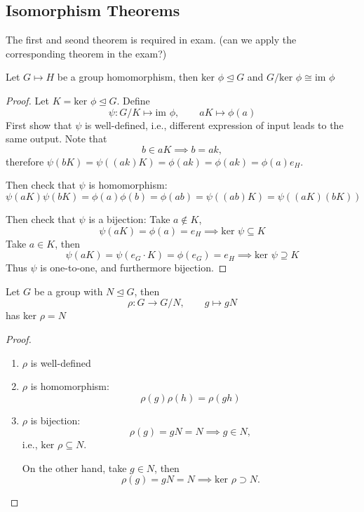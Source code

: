 \subsection{Isomorphism Theorems}
The first and seond theorem is required in exam. (can we apply the corresponding theorem in the exam?)

\begin{theorem}
Let $G\mapsto H$ be a group homomorphism, then $\mbox{ker }\phi\trianglelefteq G$ and $G/\mbox{ker }\phi\cong\mbox{im }\phi$
\end{theorem}
\begin{proof}
Let $K=\mbox{ker }\phi\trianglelefteq G$. Define 
\[
\psi:G/K\mapsto\mbox{im }\phi,\qquad
aK\mapsto\phi(a)
\]
First show that $\psi$ is well-defined, i.e., different expression of input leads to the same output. Note that
\[
b\in aK\implies b=ak,
\]
therefore $\psi(bK)=\psi((ak)K)=\phi(ak)=\phi(ak)=\phi(a)e_H$.

Then check that $\psi$ is homomorphism:
\[
\psi(aK)\psi(bK)=\phi(a)\phi(b)=\phi(ab)=\psi((ab)K)
=\psi((aK)(bK))
\]

Then check that $\psi$ is a bijection: Take $a\notin K$,
\[
\psi(aK)=\phi(a)=e_H\implies
\mbox{ker }\psi\subseteq K
\]
Take $a\in K$, then
\[
\psi(aK)=\psi(e_G\cdot K)=\phi(e_G)=e_H\implies
\mbox{ker }\psi\supseteq K
\]
Thus $\psi$ is one-to-one, and furthermore bijection.
\end{proof}

\begin{theorem}
Let $G$ be a group with $N\trianglelefteq G$, then 
\[
\rho: G\to G/N,\qquad g\mapsto gN
\]
has $\mbox{ker }\rho=N$
\end{theorem}
\begin{proof}
\begin{enumerate}
\item
$\rho$ is well-defined
\item
$\rho$ is homomorphism:
\[
\rho(g)\rho(h)=\rho(gh)
\]
\item
$\rho$ is bijection:
\[
\rho(g)=gN=N\implies g\in N,
\]
i.e., $\mbox{ker }\rho\subseteq N$.

On the other hand, take $g\in N$, then
\[
\rho(g)=gN=N\implies\mbox{ker }\rho\supset N.
\]
\end{enumerate}
\end{proof}

